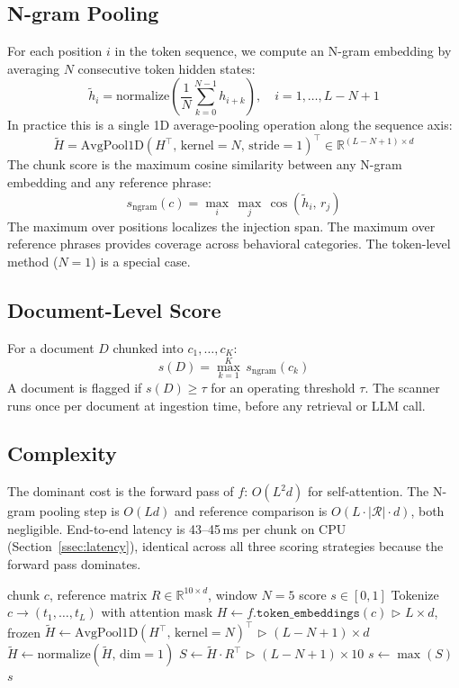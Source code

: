 \documentclass[conference]{IEEEtran}
\begin{document}
\subsection{N-gram Pooling}
\label{ssec:ngram}

For each position \(i\) in the token sequence, we compute an N-gram embedding by
averaging \(N\) consecutive token hidden states:
\[
  \tilde{h}_i = \mathrm{normalize}\!\left( \frac{1}{N} \sum_{k=0}^{N-1} h_{i+k} \right),
  \quad i = 1, \dots, L - N + 1
\]
In practice this is a single 1D average-pooling operation along the sequence axis:
\[
  \tilde{H} = \mathrm{AvgPool1D}(H^\top,\,\text{kernel}=N,\,\text{stride}=1)^\top
  \in \mathbb{R}^{(L-N+1) \times d}
\]
The chunk score is the maximum cosine similarity between any N-gram embedding and any
reference phrase:
\[
  s_\text{ngram}(c) = \max_{i}\, \max_{j}\, \cos\!\left(\tilde{h}_i,\, r_j\right)
\]
The maximum over positions localizes the injection span. The maximum over reference
phrases provides coverage across behavioral categories. The token-level method
(\(N = 1\)) is a special case.

\subsection{Document-Level Score}

For a document \(D\) chunked into \(c_1, \dots, c_K\):
\[
  s(D) = \max_{k=1}^{K}\, s_\text{ngram}(c_k)
\]
A document is flagged if \(s(D) \geq \tau\) for an operating threshold \(\tau\).
The scanner runs once per document at ingestion time, before any retrieval or LLM
call.

\subsection{Complexity}

The dominant cost is the forward pass of \(f\): \(O(L^2 d)\) for self-attention.
The N-gram pooling step is \(O(Ld)\) and reference comparison is
\(O(L \cdot |\mathcal{R}| \cdot d)\), both negligible. End-to-end latency is
43--45\,ms per chunk on CPU (Section~\ref{ssec:latency}), identical across all
three scoring strategies because the forward pass dominates.

\begin{algorithm}
\caption{N-gram Injection Scanner}
\label{alg:scanner}
\begin{algorithmic}[1]
\REQUIRE chunk \(c\), reference matrix \(R \in \mathbb{R}^{10 \times d}\), window \(N = 5\)
\ENSURE score \(s \in [0, 1]\)
\STATE Tokenize \(c \to (t_1, \ldots, t_L)\) with attention mask
\STATE \(H \leftarrow f.\texttt{token\_embeddings}(c)\) \hfill \(\triangleright\) \(L \times d\), frozen
\STATE \(\tilde{H} \leftarrow \mathrm{AvgPool1D}(H^\top,\,\text{kernel}=N)^\top\) \hfill \(\triangleright\) \((L{-}N{+}1) \times d\)
\STATE \(\tilde{H} \leftarrow \mathrm{normalize}(\tilde{H},\,\text{dim}=1)\)
\STATE \(S \leftarrow \tilde{H} \cdot R^\top\) \hfill \(\triangleright\) \((L{-}N{+}1) \times 10\)
\STATE \(s \leftarrow \max(S)\)
\RETURN \(s\)
\end{algorithmic}
\end{algorithm}
\end{document}
